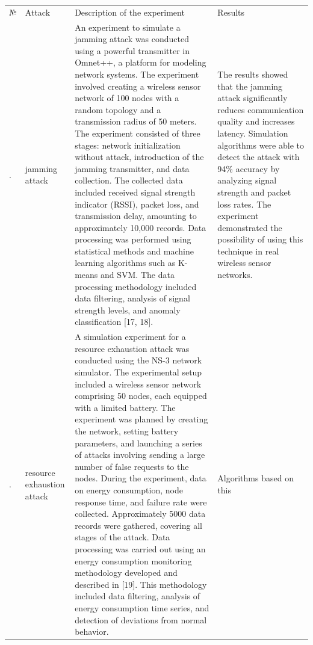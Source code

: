 \begin{longtable}[]{@{}
  >{\raggedright\arraybackslash}p{}
  >{\raggedright\arraybackslash}p{}
  >{\raggedright\arraybackslash}p{}
  >{\raggedright\arraybackslash}p{}@{}}
\toprule\noalign{}
\endhead
\bottomrule\noalign{}
\endlastfoot
№ & Attack & Description of the experiment & Results \\
1. & jamming attack & An experiment to simulate a jamming attack was
conducted using a powerful transmitter in Omnet++, a platform for
modeling network systems. The experiment involved creating a wireless
sensor network of 100 nodes with a random topology and a transmission
radius of 50 meters. The experiment consisted of three stages: network
initialization without attack, introduction of the jamming transmitter,
and data collection. The collected data included received signal
strength indicator (RSSI), packet loss, and transmission delay,
amounting to approximately 10,000 records. Data processing was performed
using statistical methods and machine learning algorithms such as
K-means and SVM. The data processing methodology included data
filtering, analysis of signal strength levels, and anomaly
classification {[}17, 18{]}. & The results showed that the jamming
attack significantly reduces communication quality and increases
latency. Simulation algorithms were able to detect the attack with 94\%
accuracy by analyzing signal strength and packet loss rates. The
experiment demonstrated the possibility of using this technique in real
wireless sensor networks. \\
2. & resource exhaustion attack & A simulation experiment for a resource
exhaustion attack was conducted using the NS-3 network simulator. The
experimental setup included a wireless sensor network comprising 50
nodes, each equipped with a limited battery. The experiment was planned
by creating the network, setting battery parameters, and launching a
series of attacks involving sending a large number of false requests to
the nodes. During the experiment, data on energy consumption, node
response time, and failure rate were collected. Approximately 5000 data
records were gathered, covering all stages of the attack. Data
processing was carried out using an energy consumption monitoring
methodology developed and described in {[}19{]}. This methodology
included data filtering, analysis of energy consumption time series, and
detection of deviations from normal behavior. & Algorithms based on this

\end{longtable}
